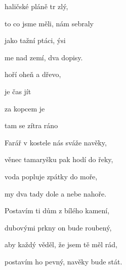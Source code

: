 

\zs
{} haličské pláně tr zlý,

to  co jsme měli, nám  sebraly

jako tažní ptáci, ýsi

me nad zemí, dva  dopisy.
\ks


\zr
{} hoří oheň a  dřevo,

 je čas jít  

 za kopcem je 

tam  se zítra ráno 
\kr

\zs
Farář v kostele nás sváže navěky,

věnec tamaryšku pak hodí do řeky,

voda popluje zpátky do moře,

my dva tady dole a nebe nahoře.
\ks

\zr \kr

\zs
Postavím ti dům z bílého kamení,

dubovými prkny on bude roubený,

aby každý věděl, že jsem tě měl rád,

postavím ho pevný, navěky bude stát.
\ks


\zr \kr

\kp





